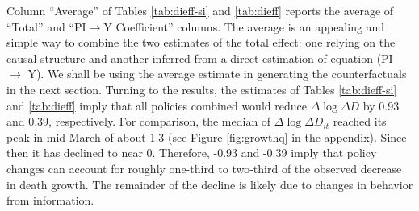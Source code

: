\documentclass[3p, longtitle]{elsarticle}
\theoremstyle{definition}
\renewcommand{\to}{{\rightarrow}}
\begin{document}









Column ``Average'' of  Tables \ref{tab:dieff-si} and \ref{tab:dieff}   reports the average of
``Total'' and ``PI$\to$Y Coefficient'' columns.  The average is an appealing and simple way
to combine the two estimates of the total effect: one relying on the causal structure and another inferred from a direct estimation of equation (PI $\to$ Y).
We shall be using the average estimate in generating the counterfactuals in the next section. Turning to the results, the estimates of Tables \ref{tab:dieff-si} and \ref{tab:dieff}  imply that all policies combined would reduce
\(\Delta \log \Delta D\) by  0.93 and  0.39, respectively. For
comparison, the median of \(\Delta \log \Delta D_{it}\) reached its
peak in mid-March of about 1.3 (see Figure \ref{fig:growthq} in the
appendix). Since then it has declined to near 0. Therefore,  -0.93 and -0.39 imply
that policy changes can account for roughly one-third to two-third of the observed
decrease in death growth.  The remainder of the decline is likely due
to changes in behavior from information.
\end{document}
